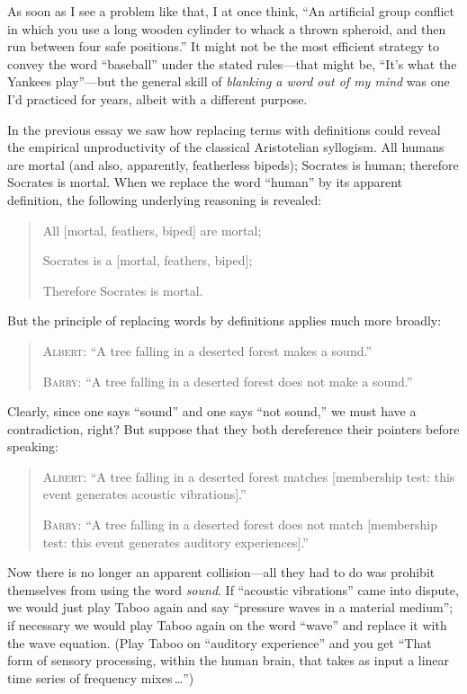 { As soon as I see a problem like that, I at once think,
``An artificial group conflict in which you use a long
wooden cylinder to whack a thrown spheroid, and then run between four
safe positions.'' It might not be the most efficient
strategy to convey the word
``baseball'' under the stated
rules---that might be, ``It's what the
Yankees play''---but the general skill of
\textit{blanking a word out of my mind} was one I'd
practiced for years, albeit with a different purpose.


 In the previous essay we saw how replacing terms with definitions
could reveal the empirical unproductivity of the classical Aristotelian
syllogism. All humans are mortal (and also, apparently, featherless
bipeds); Socrates is human; therefore Socrates is mortal. When we
replace the word ``human'' by its
apparent definition, the following underlying reasoning is revealed:

\begin{quotation}

 All [mortal, {\textlnot}feathers, biped] are mortal;


 Socrates is a [mortal, {\textlnot}feathers, biped];

{
  Therefore Socrates is mortal.}
\end{quotation}


 But the principle of replacing words by definitions applies much
more broadly:

\begin{quotation}

 \textsc{Albert}: ``A tree falling in a deserted forest
makes a sound.''

{
 \textsc{Barry}: ``A tree falling in a deserted forest does
 not make a sound.''}
\end{quotation}


 Clearly, since one says
``sound'' and one says
``not sound,'' we must have a
contradiction, right? But suppose that they both dereference their
pointers before speaking:

\begin{quotation}

 \textsc{Albert}: ``A tree falling in a deserted forest
matches [membership test: this event generates acoustic
vibrations].''

{
 \textsc{Barry}: ``A tree falling in a deserted forest does
not match [membership test: this event generates auditory
  experiences].''}
\end{quotation}


 Now there is no longer an apparent collision---all they had to do
was prohibit themselves from using the word \textit{sound}. If
``acoustic vibrations'' came into
dispute, we would just play Taboo again and say
``pressure waves in a material
medium''; if necessary we would play Taboo again on
the word ``wave'' and replace it
with the wave equation. (Play Taboo on ``auditory
experience'' and you get ``That form
of sensory processing, within the human brain, that takes as input a
linear time series of frequency mixes\,\ldots'')


}
